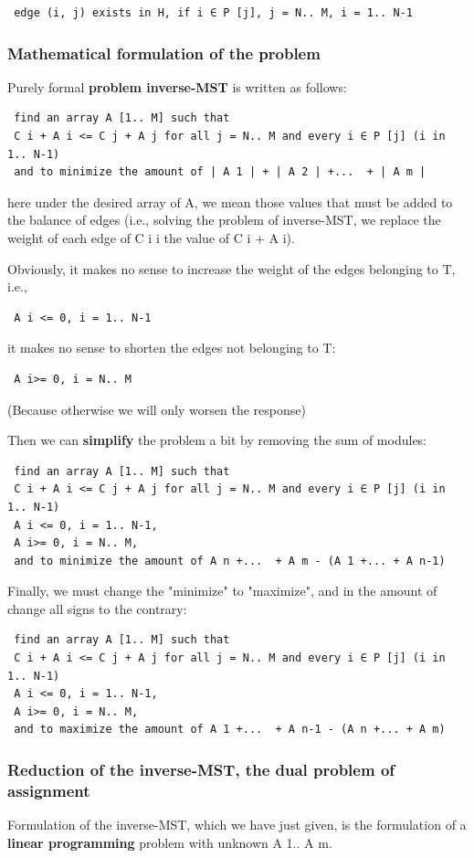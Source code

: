 \begin{verbatim}
 edge (i, j) exists in H, if i ∈ P [j], j = N.. M, i = 1.. N-1 
\end{verbatim} \subsubsection{ Mathematical formulation of the problem }
Purely formal \textbf{problem inverse-MST} is written as follows:

\begin{verbatim}
 find an array A [1.. M] such that
 C i + A i <= C j + A j for all j = N.. M and every i ∈ P [j] (i in 1.. N-1)
 and to minimize the amount of | A 1 | + | A 2 | +...  + | A m | 
\end{verbatim}
here under the desired array of A, we mean those values ​​that must be added to the balance of edges (i.e., solving the problem of inverse-MST, we replace the weight of each edge of C i i the value of C i + A i).

Obviously, it makes no sense to increase the weight of the edges belonging to T, i.e.,

\begin{verbatim}
 A i <= 0, i = 1.. N-1 
\end{verbatim}
it makes no sense to shorten the edges not belonging to T:

\begin{verbatim}
 A i>= 0, i = N.. M 
\end{verbatim}
(Because otherwise we will only worsen the response)

Then we can \textbf{simplify} the problem a bit by removing the sum of modules:

\begin{verbatim}
 find an array A [1.. M] such that
 C i + A i <= C j + A j for all j = N.. M and every i ∈ P [j] (i in 1.. N-1)
 A i <= 0, i = 1.. N-1,
 A i>= 0, i = N.. M,
 and to minimize the amount of A n +...  + A m - (A 1 +... + A n-1) 
\end{verbatim}
Finally, we must change the "minimize" to "maximize", and in the amount of change all signs to the contrary:

\begin{verbatim}
 find an array A [1.. M] such that
 C i + A i <= C j + A j for all j = N.. M and every i ∈ P [j] (i in 1.. N-1)
 A i <= 0, i = 1.. N-1,
 A i>= 0, i = N.. M,
 and to maximize the amount of A 1 +...  + A n-1 - (A n +... + A m) 
\end{verbatim} \subsubsection{ Reduction of the inverse-MST, the dual problem of assignment }
Formulation of the inverse-MST, which we have just given, is the formulation of a \textbf{linear programming} problem with unknown A 1.. A m.

